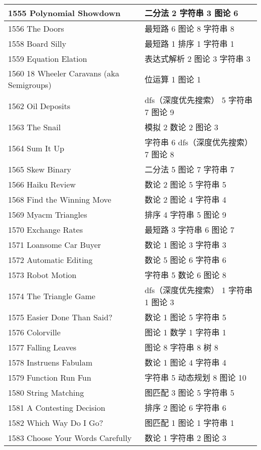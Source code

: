 \begin{longtable}{| p{} | p{} |}
 1555 Polynomial Showdown  & 二分法 2 字符串 3 图论 6 \\ \hline
 1556 The Doors  & 最短路 6 图论 8 字符串 8 \\ \hline
 1558 Board Silly  & 最短路 1 排序 1 字符串 1 \\ \hline
 1559 Equation Elation  & 表达式解析 2 图论 3 字符串 3 \\ \hline
 1560 18 Wheeler Caravans (aka Semigroups)  & 位运算 1 图论 1 \\ \hline
 1562 Oil Deposits  & dfs（深度优先搜索） 5 字符串 7 图论 9 \\ \hline
 1563 The Snail  & 模拟 2 数论 2 图论 3 \\ \hline
 1564 Sum It Up  & 字符串 6 dfs（深度优先搜索） 7 图论 8 \\ \hline
 1565 Skew Binary  & 二分法 5 图论 7 字符串 7 \\ \hline
 1566 Haiku Review  & 数论 2 图论 5 字符串 5 \\ \hline
 1568 Find the Winning Move  & 数论 2 图论 4 字符串 4 \\ \hline
 1569 Myacm Triangles  & 排序 4 字符串 5 图论 9 \\ \hline
 1570 Exchange Rates  & 最短路 3 字符串 6 图论 7 \\ \hline
 1571 Loansome Car Buyer  & 数论 1 图论 3 字符串 3 \\ \hline
 1572 Automatic Editing  & 数论 5 图论 6 字符串 6 \\ \hline
 1573 Robot Motion  & 字符串 5 数论 6 图论 8 \\ \hline
 1574 The Triangle Game  & dfs（深度优先搜索） 1 字符串 1 图论 3 \\ \hline
 1575 Easier Done Than Said?  & 数论 1 图论 5 字符串 5 \\ \hline
 1576 Colorville  & 图论 1 数学 1 字符串 1 \\ \hline
 1577 Falling Leaves  & 图论 8 字符串 8 树 8 \\ \hline
 1578 Instruens Fabulam  & 数论 1 图论 4 字符串 4 \\ \hline
 1579 Function Run Fun  & 字符串 5 动态规划 8 图论 10 \\ \hline
 1580 String Matching  & 图匹配 3 图论 5 字符串 5 \\ \hline
 1581 A Contesting Decision  & 排序 2 图论 6 字符串 6 \\ \hline
 1582 Which Way Do I Go?  & 图匹配 1 图论 1 字符串 1 \\ \hline
 1583 Choose Your Words Carefully  & 数论 1 字符串 2 图论 3 \\ \hline

\end{longtable}
